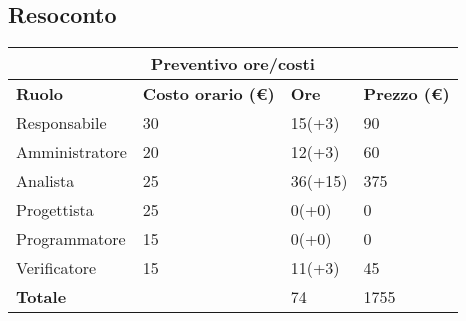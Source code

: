 \documentclass[12pt]{article}
\begin{document}
\subsection{Resoconto}
\begin{center}
    \begin{tabularx}{\textwidth}{|X|X|X|X|}
        \hline
        \multicolumn{4}{|c|}{\textbf{Preventivo ore/costi}}\\
        \hline
        \hline
        \textbf{Ruolo} & \textbf{Costo orario (\euro)} & \textbf{Ore} & \textbf{Prezzo (\euro)}\\
        \hline
        Responsabile    & 30 & 15(+3)  & 90\\
        \hline
        Amministratore  & 20 & 12(+3)  & 60\\
        \hline
        Analista        & 25 & 36(+15)  & 375\\
        \hline
        Progettista     & 25 & 0(+0)  & 0\\
        \hline
        Programmatore   & 15 & 0(+0)  & 0\\
        \hline
        Verificatore    & 15 & 11(+3)  & 45\\
        \hline
        \hline
        \textbf{Totale} &    & 74 &  1755 \\
        \hline
    \end{tabularx}\\[8pt]
    \mbox{}\\
\end{center}
\end{document}
